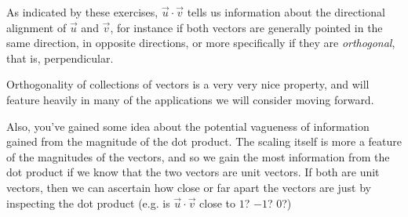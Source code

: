 \documentclass{ximera}
\begin{document}
As indicated by these exercises, $\vec{u}\cdot\vec{v}$ tells us information about the directional alignment of $\vec{u}$ and $\vec{v}$, for instance if both vectors are generally pointed in the same direction, in opposite directions, or more specifically if they are \emph{orthogonal}, that is, perpendicular.

Orthogonality of collections of vectors is a very very nice property, and will feature heavily in many of the applications we will consider moving forward. 

Also, you've gained some idea about the potential vagueness of information gained from the magnitude of the dot product. The scaling itself is more a feature of the magnitudes of the vectors, and so we gain the most information from the dot product if we know that the two vectors are unit vectors. If both are unit vectors, then we can ascertain how close or far apart the vectors are just by inspecting the dot product (e.g. is $\vec{u}\cdot\vec{v}$ close to $1$? $-1$? $0$?)
\end{document}
